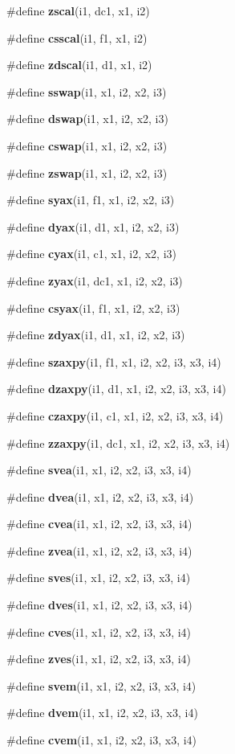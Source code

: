 \begin{CompactItemize}
\item 
\#define {\bf zscal}(i1, dc1, x1, i2)
\item 
\#define {\bf csscal}(i1, f1, x1, i2)
\item 
\#define {\bf zdscal}(i1, d1, x1, i2)
\item 
\#define {\bf sswap}(i1, x1, i2, x2, i3)
\item 
\#define {\bf dswap}(i1, x1, i2, x2, i3)
\item 
\#define {\bf cswap}(i1, x1, i2, x2, i3)
\item 
\#define {\bf zswap}(i1, x1, i2, x2, i3)
\item 
\#define {\bf syax}(i1, f1, x1, i2, x2, i3)
\item 
\#define {\bf dyax}(i1, d1, x1, i2, x2, i3)
\item 
\#define {\bf cyax}(i1, c1, x1, i2, x2, i3)
\item 
\#define {\bf zyax}(i1, dc1, x1, i2, x2, i3)
\item 
\#define {\bf csyax}(i1, f1, x1, i2, x2, i3)
\item 
\#define {\bf zdyax}(i1, d1, x1, i2, x2, i3)
\item 
\#define {\bf szaxpy}(i1, f1, x1, i2, x2, i3, x3, i4)
\item 
\#define {\bf dzaxpy}(i1, d1, x1, i2, x2, i3, x3, i4)
\item 
\#define {\bf czaxpy}(i1, c1, x1, i2, x2, i3, x3, i4)
\item 
\#define {\bf zzaxpy}(i1, dc1, x1, i2, x2, i3, x3, i4)
\item 
\#define {\bf svea}(i1, x1, i2, x2, i3, x3, i4)
\item 
\#define {\bf dvea}(i1, x1, i2, x2, i3, x3, i4)
\item 
\#define {\bf cvea}(i1, x1, i2, x2, i3, x3, i4)
\item 
\#define {\bf zvea}(i1, x1, i2, x2, i3, x3, i4)
\item 
\#define {\bf sves}(i1, x1, i2, x2, i3, x3, i4)
\item 
\#define {\bf dves}(i1, x1, i2, x2, i3, x3, i4)
\item 
\#define {\bf cves}(i1, x1, i2, x2, i3, x3, i4)
\item 
\#define {\bf zves}(i1, x1, i2, x2, i3, x3, i4)
\item 
\#define {\bf svem}(i1, x1, i2, x2, i3, x3, i4)
\item 
\#define {\bf dvem}(i1, x1, i2, x2, i3, x3, i4)
\item 
\#define {\bf cvem}(i1, x1, i2, x2, i3, x3, i4)

\end{CompactItemize}

